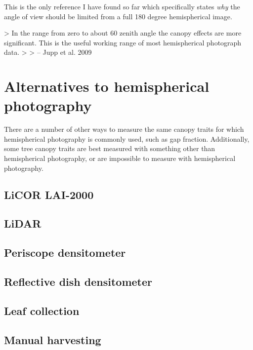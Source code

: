 \documentclass{article}
\begin{document}
This is the only reference I have found so far which specifically states \textit{why} the angle of view should be limited from a full 180 degree hemispherical image. 

> In the range from zero to about 60 zenith angle the canopy effects are more significant. This is the useful working range of most hemispherical photograph data.
> 
> -- Jupp et al. 2009



\section{Alternatives to hemispherical photography}

There are a number of other ways to measure the same canopy traits for which hemispherical photography is commonly used, such as gap fraction. Additionally, some tree canopy traits are best measured with something other than hemispherical photography, or are impossible to measure with hemispherical photography.

\subsection{LiCOR LAI-2000}

\subsection{LiDAR}

\subsection{Periscope densitometer}

\subsection{Reflective dish densitometer}

\subsection{Leaf collection}

\subsection{Manual harvesting}
\end{document}
